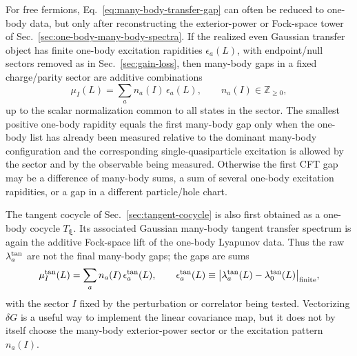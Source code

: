 \documentclass[aps,prb,onecolumn,nofootinbib,superscriptaddress]{revtex4-2}
\newcommand{\bxi}{{\boldsymbol{\xi}}}
\theoremstyle{plain}
\theoremstyle{definition}
\begin{document}
For free fermions, Eq.~\eqref{eq:many-body-transfer-gap} can often be reduced
to one-body data, but only after reconstructing the exterior-power or
Fock-space tower of Sec.~\ref{sec:one-body-many-body-spectra}.  If the
realized even Gaussian transfer object has finite one-body excitation
rapidities \(\epsilon_a(L)\), with endpoint/null sectors removed as in
Sec.~\ref{sec:gain-loss}, then many-body gaps in a fixed charge/parity sector
are additive combinations
\begin{equation}
  \mu_I(L)
  =
  \sum_a n_a(I)\,\epsilon_a(L),
  \qquad
  n_a(I)\in\mathbb Z_{\ge 0},
  \label{eq:fock-tower-rapidities}
\end{equation}
up to the scalar normalization common to all states in the sector.  The
smallest positive one-body rapidity equals the first many-body gap only when
the one-body list has already been measured relative to the dominant
many-body configuration and the corresponding single-quasiparticle excitation
is allowed by the sector and by the observable being measured.  Otherwise the
first CFT gap may be a difference of many-body sums, a sum of several
one-body excitation rapidities, or a gap in a different particle/hole chart.

The tangent cocycle of Sec.~\ref{sec:tangent-cocycle} is also first obtained
as a one-body cocycle \(T_\bxi\).  Its associated Gaussian many-body tangent
transfer spectrum is again the additive Fock-space lift of the one-body
Lyapunov data.  Thus the raw \(\lambda^{\rm tan}_a\) are not the final
many-body gaps; the gaps are sums
\begin{equation}
  \mu_I^{\rm tan}(L)
  =
  \sum_a n_a(I)\,\epsilon^{\rm tan}_a(L),
  \qquad
  \epsilon^{\rm tan}_a(L)\equiv
  \bigl|\lambda^{\rm tan}_a(L)-\lambda^{\rm tan}_0(L)\bigr|_{\rm finite},
  \label{eq:tangent-fock-tower}
\end{equation}
with the sector \(I\) fixed by the perturbation or correlator being tested.
Vectorizing \(\delta G\) is a useful way to implement the linear covariance
map, but it does not by itself choose the many-body exterior-power sector or
the excitation pattern \(n_a(I)\).
\end{document}
